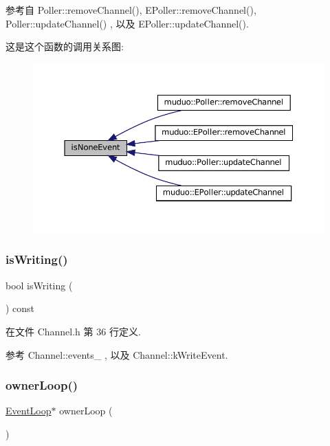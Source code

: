 参考自 Poller\+::remove\+Channel(), E\+Poller\+::remove\+Channel(), Poller\+::update\+Channel() , 以及 E\+Poller\+::update\+Channel().

这是这个函数的调用关系图\+:
\nopagebreak
\begin{figure}[H]
\begin{center}
\leavevmode
\includegraphics[width=350pt]{classmuduo_1_1Channel_af586af8cbcc49b563969f6c8356b3c9a_icgraph}
\end{center}
\end{figure}
\mbox{\label{classmuduo_1_1Channel_a181a6a67a97d760db63a2c3294ed22e3}} 
\subsubsection{\texorpdfstring{is\+Writing()}{isWriting()}}
{\footnotesize\ttfamily bool is\+Writing (\begin{DoxyParamCaption}{ }\end{DoxyParamCaption}) const\hspace{0.3cm}{\ttfamily [inline]}}



在文件 Channel.\+h 第 36 行定义.



参考 Channel\+::events\+\_\+ , 以及 Channel\+::k\+Write\+Event.

\mbox{\label{classmuduo_1_1Channel_a2e24e2ab7ada4682fdf49cc835d85e8d}} 
\subsubsection{\texorpdfstring{owner\+Loop()}{ownerLoop()}}
{\footnotesize\ttfamily \hyperlink{classmuduo_1_1EventLoop}{Event\+Loop}$\ast$ owner\+Loop (\begin{DoxyParamCaption}{ }\end{DoxyParamCaption})\hspace{0.3cm}{\ttfamily [inline]}}



